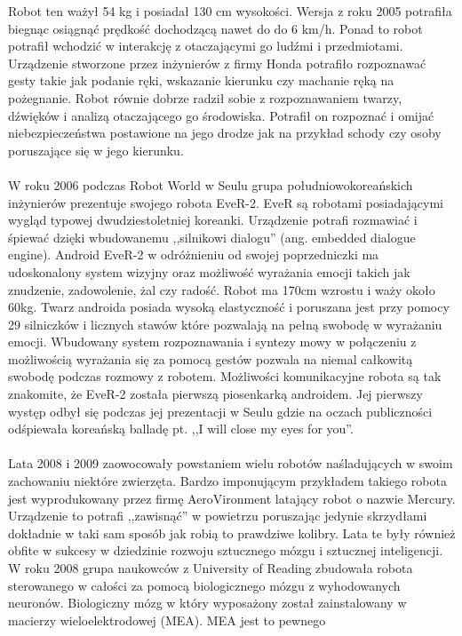 Robot ten ważył 54 kg i posiadał 130 cm wysokości. Wersja z roku 2005 potrafiła
biegnąc osiągnąć prędkość dochodzącą nawet do do 6 km/h. Ponad to robot potrafił
wchodzić w interakcję z otaczającymi go ludźmi i przedmiotami. Urządzenie
stworzone przez inżynierów z firmy Honda potrafiło rozpoznawać gesty takie jak
podanie ręki, wskazanie kierunku czy machanie ręką na pożegnanie. Robot równie
dobrze radził sobie z rozpoznawaniem twarzy, dźwięków i analizą otaczającego go
środowiska. Potrafił on rozpoznać i omijać niebezpieczeństwa postawione na jego
drodze jak na przykład schody czy osoby poruszające się w jego kierunku.\\
\\
W roku 2006 podczas Robot World w Seulu grupa południowokoreańskich inżynierów
prezentuje swojego robota EveR-2. EveR są robotami posiadającymi wygląd typowej
dwudziestoletniej koreanki. Urządzenie potrafi rozmawiać i śpiewać dzięki
wbudowanemu ,,silnikowi dialogu'' (ang. embedded dialogue engine). Android
EveR-2 w odróżnieniu od swojej poprzedniczki ma udoskonalony system wizyjny
oraz możliwość wyrażania emocji takich jak znudzenie, zadowolenie, żal czy radość.
Robot ma 170cm wzrostu i waży około 60kg. Twarz androida posiada wysoką
elastyczność i poruszana jest przy pomocy 29 silniczków i licznych stawów
które pozwalają na pełną swobodę w wyrażaniu emocji. Wbudowany system
rozpoznawania i syntezy mowy w połączeniu z możliwością wyrażania się za pomocą
gestów pozwala na niemal całkowitą swobodę podczas rozmowy z robotem. Możliwości
komunikacyjne robota są tak znakomite, że EveR-2 została pierwszą piosenkarką
androidem. Jej pierwszy występ odbył się podczas jej prezentacji w Seulu gdzie
na oczach publiczności odśpiewała koreańską balladę pt. ,,I will close my eyes
for you''.\\
\\
Lata 2008 i 2009 zaowocowały powstaniem wielu robotów naśladujących w swoim
zachowaniu niektóre zwierzęta. Bardzo imponującym przykładem takiego robota jest
wyprodukowany przez firmę AeroVironment latający robot o nazwie Mercury.
Urządzenie to potrafi ,,zawisnąć'' w powietrzu poruszając jedynie skrzydłami
dokładnie w taki sam sposób jak robią to prawdziwe kolibry. Lata te były również
obfite w sukcesy w dziedzinie rozwoju sztucznego mózgu i sztucznej inteligencji.
W roku 2008 grupa naukowców z University of Reading zbudowała robota sterowanego w całości za
pomocą biologicznego mózgu z wyhodowanych neuronów. Biologiczny mózg w który wyposażony
został zainstalowany w macierzy wieloelektrodowej (MEA). MEA jest to pewnego

